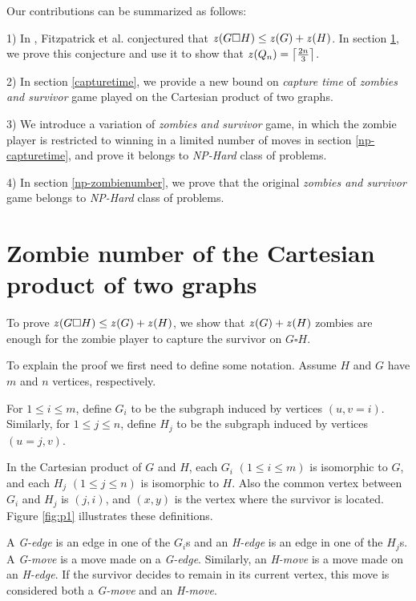 \documentclass[1p]{elsarticle}
\DeclarePairedDelimiter\ceil{\lceil}{\rceil} \DeclarePairedDelimiter\floor{\lfloor}{\rfloor}
\newcommand{\zn}{\ooalign{$z$\cr\hfil\rule[.5ex]{.2em}{.08ex}\hfil\cr}}
\begin{document}
Our contributions can be summarized as follows:

1) In \cite{Fitz16}, Fitzpatrick et al. conjectured that $\zn(G \square H) \leq \zn(G) + \zn(H)$. In section \ref{conj-proof}, we prove this conjecture and
use it to show that $\zn(Q_n) = \ceil*{\frac{2n}{3}}$. 

2) In section \ref{capturetime}, we provide a new bound on {\it capture time} of {\it zombies and survivor} game played on the Cartesian
product of two graphs. 

3) We introduce a variation of {\it zombies and survivor} game, in which the zombie player is restricted to winning in a
limited number of moves in section \ref{np-capturetime}, and prove it belongs to {\it NP-Hard} class of problems.

4) In section \ref{np-zombienumber}, we prove that the original {\it zombies and survivor} game belongs to {\it NP-Hard} class
of problems.


\section{Zombie number of the Cartesian product of two graphs}\label{conj-proof}

To prove $\zn(G \square H) \leq \zn(G) + \zn(H)$, we show that $\zn(G) + \zn(H)$ zombies are enough for the zombie player to
capture the survivor on $G \square H$.

To explain the proof we first need to define some notation. Assume $H$ and $G$ have $m$ and $n$ vertices,
respectively. 

For $1 \leq i \leq m$, define $G_i$ to be the subgraph induced by vertices $(u,v = i)$. Similarly, for $1 \leq j \leq
n$, define $H_{j}$ to be the subgraph induced by vertices $(u = j,v)$.

In the Cartesian product of $G$ and $H$, each $G_{i}$ $(1 \leq i \leq m)$ is isomorphic to $G$, and each $H_{j}$ $(1
\leq j \leq n)$ is isomorphic to $H$. Also the common vertex between $G_{i}$ and $H_{j}$ is $(j,i)$, and $(x,y)$ is the
vertex where the survivor is located. Figure \ref{fig:p1} illustrates these definitions.

A {\it G-edge} is an edge in one of the $G_{i}$s and an {\it H-edge} is an edge in one of the $H_{j}$s. A {\it G-move}
is a move made on a {\it G-edge}. Similarly, an {\it H-move} is a move made on an {\it H-edge}. If the survivor decides
to remain in its current vertex, this move is considered both a {\it G-move} and an {\it H-move}. 
\end{document}
